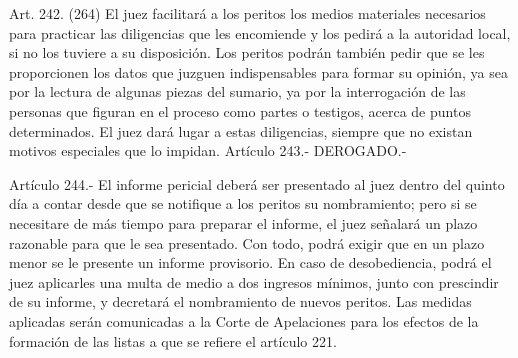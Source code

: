     Art. 242. (264) El juez facilitará a los peritos los medios materiales necesarios para practicar las diligencias que les encomiende y los pedirá a la autoridad local, si no los tuviere a su disposición.
    Los peritos podrán también pedir que se les proporcionen los datos que juzguen indispensables para formar su opinión, ya sea por la lectura de algunas piezas del sumario, ya por la interrogación de las personas que figuran en el proceso como partes o testigos, acerca de puntos determinados. El juez dará lugar a estas diligencias, siempre que no existan motivos especiales que lo impidan.
    Artículo 243.- DEROGADO.-


    Artículo 244.- El informe pericial deberá ser presentado al juez dentro del quinto día a contar desde que se notifique a los peritos su nombramiento; pero si se necesitare de más tiempo para preparar el informe, el juez señalará un plazo razonable para que le sea presentado. Con todo, podrá exigir que en un plazo menor se le presente un informe provisorio.
    En caso de desobediencia, podrá el juez aplicarles una multa de medio a dos ingresos mínimos, junto con prescindir de su informe, y decretará el nombramiento de nuevos peritos.  Las medidas aplicadas serán comunicadas a la Corte de Apelaciones para los efectos de la formación de las listas a que se refiere el artículo 221.

